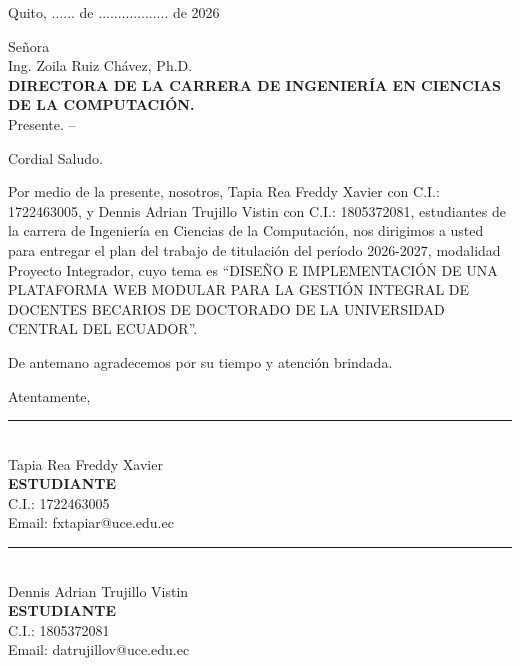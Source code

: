 
\pagestyle{empty}
\onehalfspacing
\fontsize{12}{18}\selectfont

\begin{flushright}
Quito, ...... de .................. de 2026
\end{flushright}

\vspace{0.6cm}

\begin{flushleft}
Señora \\
Ing. Zoila Ruiz Chávez, Ph.D. \\
\textbf{DIRECTORA DE LA CARRERA DE INGENIERÍA EN CIENCIAS DE LA COMPUTACIÓN.} \\
Presente. --
\end{flushleft}

\vspace{0.6cm}

Cordial Saludo.

Por medio de la presente, nosotros, Tapia Rea Freddy Xavier con C.I.: 1722463005, y Dennis Adrian Trujillo Vistin con C.I.: 1805372081, estudiantes de la carrera de Ingeniería en Ciencias de la Computación, nos dirigimos a usted para entregar el plan del trabajo de titulación del período 2026-2027, modalidad Proyecto Integrador, cuyo tema es “DISEÑO E IMPLEMENTACIÓN DE UNA PLATAFORMA WEB MODULAR PARA LA GESTIÓN INTEGRAL DE DOCENTES BECARIOS DE DOCTORADO DE LA UNIVERSIDAD CENTRAL DEL ECUADOR”.

De antemano agradecemos por su tiempo y atención brindada.

Atentamente,

\vspace{2.2cm}

\noindent
\begin{minipage}[t]{0.45\linewidth}
    \centering
    \rule{5.8cm}{0.4pt} \\[0.2cm]
    Tapia Rea Freddy Xavier \\
    \textbf{ESTUDIANTE} \\
    C.I.: 1722463005 \\
    Email: fxtapiar@uce.edu.ec
\end{minipage}%
\hfill
\begin{minipage}[t]{0.45\linewidth}
    \centering
    \rule{5.8cm}{0.4pt} \\[0.2cm]
    Dennis Adrian Trujillo Vistin \\
    \textbf{ESTUDIANTE} \\
    C.I.: 1805372081 \\
    Email: datrujillov@uce.edu.ec
\end{minipage}

\newpage
